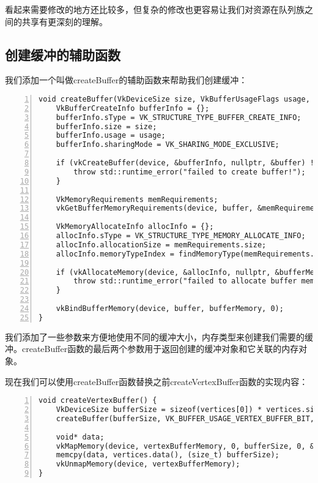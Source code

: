 \documentclass{ctexart}
\begin{document}
看起来需要修改的地方还比较多，但复杂的修改也更容易让我们对资源在队列族之间的共享有更深刻的理解。

\subsection{创建缓冲的辅助函数}

我们添加一个叫做createBuffer的辅助函数来帮助我们创建缓冲：

\begin{lstlisting}[language={[ANSI]C},keywordstyle=\color{blue!70},commentstyle=\color{red!50!green!50!blue!50},frame=shadowbox, rulesepcolor=\color{red!20!green!20!blue!20},basicstyle=\small,numbers=left, numberstyle=\tiny,breaklines=true]
void createBuffer(VkDeviceSize size, VkBufferUsageFlags usage, VkMemoryPropertyFlags properties, VkBuffer& buffer, VkDeviceMemory& bufferMemory) {
	VkBufferCreateInfo bufferInfo = {};
	bufferInfo.sType = VK_STRUCTURE_TYPE_BUFFER_CREATE_INFO;
	bufferInfo.size = size;
	bufferInfo.usage = usage;
	bufferInfo.sharingMode = VK_SHARING_MODE_EXCLUSIVE;

	if (vkCreateBuffer(device, &bufferInfo, nullptr, &buffer) != VK_SUCCESS) {
		throw std::runtime_error("failed to create buffer!");
	}

	VkMemoryRequirements memRequirements;
	vkGetBufferMemoryRequirements(device, buffer, &memRequirements);

	VkMemoryAllocateInfo allocInfo = {};
	allocInfo.sType = VK_STRUCTURE_TYPE_MEMORY_ALLOCATE_INFO;
	allocInfo.allocationSize = memRequirements.size;
	allocInfo.memoryTypeIndex = findMemoryType(memRequirements.memoryTypeBits, properties);

	if (vkAllocateMemory(device, &allocInfo, nullptr, &bufferMemory) != VK_SUCCESS) {
		throw std::runtime_error("failed to allocate buffer memory!");
	}

	vkBindBufferMemory(device, buffer, bufferMemory, 0);
}
\end{lstlisting}

我们添加了一些参数来方便地使用不同的缓冲大小，内存类型来创建我们需要的缓冲。createBuffer函数的最后两个参数用于返回创建的缓冲对象和它关联的内存对象。

现在我们可以使用createBuffer函数替换之前createVertexBuffer函数的实现内容：

\begin{lstlisting}[language={[ANSI]C},keywordstyle=\color{blue!70},commentstyle=\color{red!50!green!50!blue!50},frame=shadowbox, rulesepcolor=\color{red!20!green!20!blue!20},basicstyle=\small,numbers=left, numberstyle=\tiny,breaklines=true]
void createVertexBuffer() {
	VkDeviceSize bufferSize = sizeof(vertices[0]) * vertices.size();
	createBuffer(bufferSize, VK_BUFFER_USAGE_VERTEX_BUFFER_BIT, VK_MEMORY_PROPERTY_HOST_VISIBLE_BIT |VK_MEMORY_PROPERTY_HOST_COHERENT_BIT, vertexBuffer, vertexBufferMemory);

	void* data;
	vkMapMemory(device, vertexBufferMemory, 0, bufferSize, 0, &data);
	memcpy(data, vertices.data(), (size_t) bufferSize);
	vkUnmapMemory(device, vertexBufferMemory);
}
\end{lstlisting}
\end{document}
